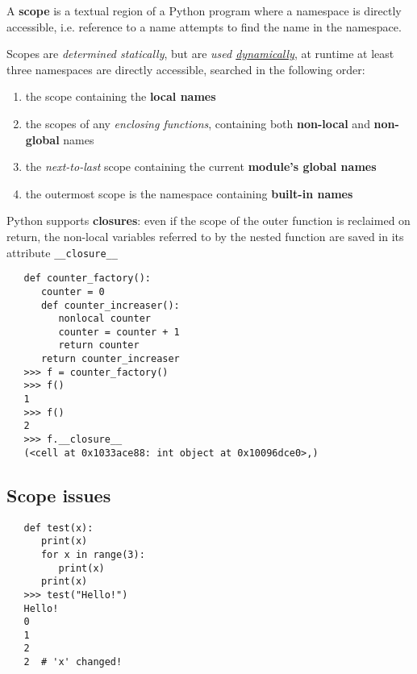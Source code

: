 A \textbf{scope} is a textual region of a Python program where a
namespace is directly accessible, i.e. reference to a name
attempts to find the name in the namespace.

Scopes are \textit{determined statically}, but are \textit{used \underline{dynamically}},
at runtime at least three namespaces are directly accessible, searched in the following order:
\begin{enumerate}
   \item the scope containing the \textbf{local names}
   \item the scopes of any \textit{enclosing functions}, containing both \textbf{non-local} and \textbf{non-global} names
   \item the \textit{next-to-last} scope containing the current \textbf{module’s global names}
   \item the outermost scope is the namespace containing \textbf{built-in names}
\end{enumerate}

Python supports \textbf{closures}: 
even if the scope of the
outer function is reclaimed on return, the non-local variables referred to by the nested function are saved
in its attribute \lstinline|__closure__|

\begin{lstlisting}
   def counter_factory():
      counter = 0
      def counter_increaser():
         nonlocal counter
         counter = counter + 1
         return counter
      return counter_increaser
   >>> f = counter_factory()
   >>> f()
   1
   >>> f()
   2
   >>> f.__closure__
   (<cell at 0x1033ace88: int object at 0x10096dce0>,)
\end{lstlisting}

\subsection{Scope issues}
\begin{lstlisting}
   def test(x):
      print(x)
      for x in range(3):
         print(x)
      print(x)
   >>> test("Hello!")
   Hello!
   0
   1
   2
   2  # 'x' changed!
\end{lstlisting}